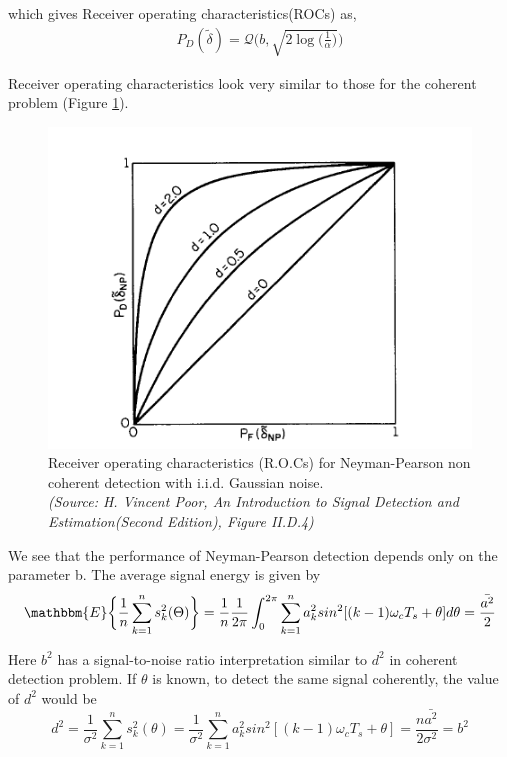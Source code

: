 \documentclass[a4paper,english,12pt]{article}
\begin{document}
which gives Receiver operating characteristics(ROCs) as,
\begin{equation*}
\begin{aligned}
P_D(\tilde{\delta})=\mathcal{Q}\bigg(b,\sqrt{2\log\bigg(\frac{1}{\alpha}\bigg)}\bigg)
\end{aligned}
\end{equation*}
 \par Receiver operating characteristics look very similar to those for the coherent problem (Figure \ref{fn2}). 
\begin{figure}[hbtp]
	\centering
	\includegraphics[scale=0.75]{Figures/VP_II_D_4.png}
	\caption{Receiver operating characteristics (R.O.Cs) for Neyman-Pearson non coherent detection with i.i.d. Gaussian noise.  \\ \textit{(Source: H. Vincent Poor, An Introduction to Signal Detection and Estimation(Second
			Edition), Figure II.D.4)}}
	\label{fn2}
\end{figure}
We see that the performance of Neyman-Pearson detection depends only on the parameter b. The average signal energy is given by
\begin{equation}
 \label{n19}
\mathbbm{E}\bigg\{\frac{1}{n}\sum_{k=1}^{n}s_k^2(\Theta) \bigg\}=\frac{1}{n}\frac{1}{2\pi}\int_{0}^{2\pi}\sum_{k=1}^{n}a_k^2sin^2[(k-1)\omega_cT_s+\theta]d\theta = \frac{\bar{a^2}}{2}
\end{equation} 
\par Here $b^2$ has a signal-to-noise ratio interpretation similar to $d^2$ in coherent detection problem. If $\theta$ is known, to detect the same signal coherently, the value of $d^2$ would be
\begin{equation}
 \label{n20}
d^2=\frac{1}{\sigma^2}\sum_{k=1}^{n}s_k^2(\theta)=\frac{1}{\sigma^2}\sum_{k=1}^{n}a_k^2sin^2[(k-1)\omega_c T_s+\theta]=\frac{n\bar{a^2}}{2\sigma^2}=b^2
\end{equation}
\end{document}
